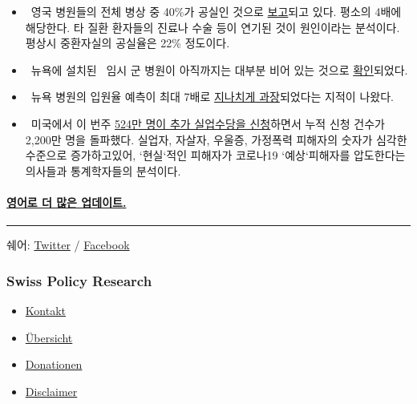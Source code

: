 \begin{itemize}
\item
  ~영국 병원들의 전체 병상 중 40\%가 공실인 것으로
  \href{https://www.hsj.co.uk/acute-care/nhs-hospitals-have-four-times-more-empty-beds-than-normal/7027392.article}{보고}되고
  있다. 평소의 4배에 해당한다. 타 질환 환자들의 진료나 수술 등이 연기된
  것이 원인이라는 분석이다. 평상시 중환자실의 공실율은 22\% 정도이다.
\item
  ~뉴욕에 설치된~ 임시 군 병원이 아직까지는 대부분 비어 있는 것으로
  \href{https://nypost.com/2020/04/09/usns-comfort-and-javits-center-mostly-empty-amid-coronavirus/}{확인}되었다.
\item
  ~뉴욕 병원의 입원율 예측이 최대 7배로
  \href{https://nypost.com/2020/04/09/usns-comfort-and-javits-center-mostly-empty-amid-coronavirus/}{지나치게
  과장}되었다는 지적이 나왔다.
\item
  ~미국에서 이 번주
  \href{https://finance.yahoo.com/news/coronavirus-covid-weekly-initial-jobless-claims-april-11-192401571.html}{524만
  명이 추가 실업수당을 신청}하면서 누적 신청 건수가 2,200만 명을
  돌파했다. 실업자, 자살자, 우울증, 가정폭력 피해자의 숫자가 심각한
  수준으로 증가하고있어, `현실`적인 피해자가 코로나19 `예상`피해자를
  압도한다는 의사들과 통계학자들의 분석이다. 
\end{itemize}

\hypertarget{uxc601uxc5b4uxb85c-uxb354-uxb9ceuxc740-uxc5c5uxb370uxc774uxd2b8}{%
\paragraph{\texorpdfstring{\href{https://swprs.org/a-swiss-doctor-on-covid-19/}{영어로
더 많은
업데이트.}}{영어로 더 많은 업데이트.}}\label{uxc601uxc5b4uxb85c-uxb354-uxb9ceuxc740-uxc5c5uxb370uxc774uxd2b8}}

\begin{center}\rule{0.5\linewidth}{\linethickness}\end{center}

쉐어:
\href{https://twitter.com/intent/tweet?url=https://swprs.org/covid19-korean/}{Twitter}
/
\href{https://www.facebook.com/share.php?u=https://swprs.org/covid19-korean/}{Facebook}

\hypertarget{swiss-policy-research}{%
\subsubsection{Swiss Policy Research}\label{swiss-policy-research}}

\begin{itemize}
\tightlist
\item
  \href{https://swprs.org/kontakt/}{Kontakt}
\item
  \href{https://swprs.org/uebersicht/}{Übersicht}
\item
  \href{https://swprs.org/donationen/}{Donationen}
\item
  \href{https://swprs.org/disclaimer/}{Disclaimer}
\end{itemize}

